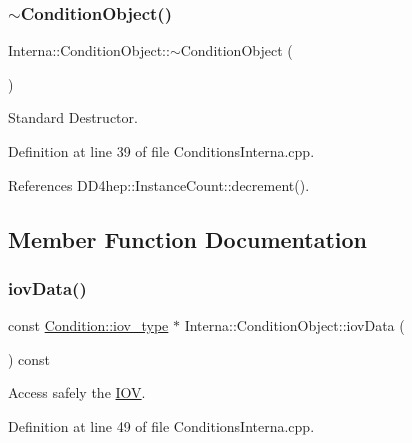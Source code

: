 \subsubsection{\texorpdfstring{$\sim$\+Condition\+Object()}{~ConditionObject()}}
{\footnotesize\ttfamily Interna\+::\+Condition\+Object\+::$\sim$\+Condition\+Object (\begin{DoxyParamCaption}{ }\end{DoxyParamCaption})\hspace{0.3cm}{\ttfamily [virtual]}}



Standard Destructor. 



Definition at line 39 of file Conditions\+Interna.\+cpp.



References D\+D4hep\+::\+Instance\+Count\+::decrement().



\subsection{Member Function Documentation}
\hypertarget{class_d_d4hep_1_1_conditions_1_1_interna_1_1_condition_object_a7d71b92cf668d0f5a9ad17e0895b0e5f}{}\label{class_d_d4hep_1_1_conditions_1_1_interna_1_1_condition_object_a7d71b92cf668d0f5a9ad17e0895b0e5f} 
\subsubsection{\texorpdfstring{iov\+Data()}{iovData()}}
{\footnotesize\ttfamily const \hyperlink{class_d_d4hep_1_1_conditions_1_1_condition_ad84300e226b2085ec5e9db7f47be5539}{Condition\+::iov\+\_\+type} $\ast$ Interna\+::\+Condition\+Object\+::iov\+Data (\begin{DoxyParamCaption}{ }\end{DoxyParamCaption}) const}



Access safely the \hyperlink{class_d_d4hep_1_1_i_o_v}{I\+OV}. 



Definition at line 49 of file Conditions\+Interna.\+cpp.



